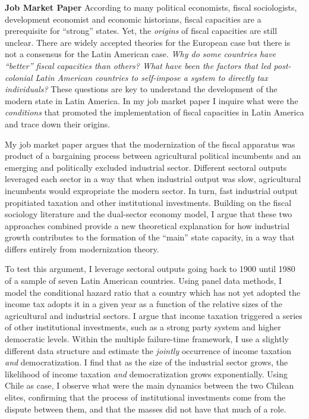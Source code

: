 \documentclass[11pt]{letter} %
\begin{document}
\begin{letter}{}
{\bf Job Market Paper}  According  to many political economists, fiscal sociologists, development economist and economic historians, fiscal capacities are a prerequisite for ``strong'' states. Yet, the \emph{origins} of fiscal capacities are still unclear. There are widely accepted theories for the European case but there is not a consensus for the Latin American case. \emph{Why do some countries have ``better'' fiscal capacities than others? What have been the factors that led post-colonial Latin American countries to self-impose a system to directly tax individuals?} These questions are key to understand the development of the modern state in Latin America. In my job market paper I inquire what were the \emph{conditions} that promoted the implementation of fiscal capacities in Latin America and trace down their origins.


My job market paper argues that the modernization of the fiscal apparatus was product of a bargaining process between agricultural political incumbents and an emerging and politically excluded industrial sector. Different sectoral outputs leveraged each sector in a way that when industrial output was slow, agricultural incumbents would expropriate the modern sector. In turn, fast industrial output propitiated taxation and other institutional investments. Building on the fiscal sociology literature and the dual-sector economy model, I argue that these two approaches combined provide a new theoretical explanation for how industrial growth contributes to the formation of the ``main'' state capacity, in a way that differs entirely from modernization theory. 

To test this argument, I leverage sectoral outputs going back to 1900 until 1980 of a sample of seven Latin American countries. Using panel data methods, I model the conditional hazard ratio that a country which has not yet adopted the income tax adopts it in a given year as a function of the relative sizes of the agricultural and industrial sectors. I argue that income taxation triggered a series of other institutional investments, such as a strong party system and higher democratic levels. Within the multiple failure-time framework, I use a slightly different data structure and estimate the \emph{jointly} occurrence of income taxation \emph{and} democratization. I find that as the size of the industrial sector grows, the likelihood of income taxation \emph{and} democratization grows exponentially. Using Chile as case, I observe what were the main dynamics between the two Chilean elites, confirming that the process of institutional investments come from the dispute between them, and that the masses did not have that much of a role. 


\end{letter}
\end{document}
